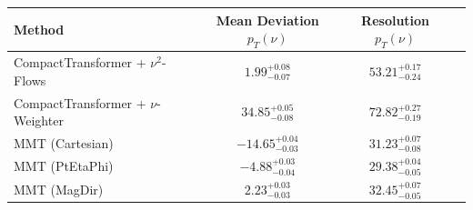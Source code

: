     \begin{tabular}{lccc}
        \toprule
        Method & Mean Deviation $p_{T}({\nu})$ & Resolution $p_{T}({\nu})$ \\
        \midrule
        CompactTransformer + $\nu^2$-Flows & $1.99^{+0.08}_{-0.07}$ & $53.21^{+0.17}_{-0.24}$ \\
        CompactTransformer + $\nu$-Weighter & $34.85^{+0.05}_{-0.08}$ & $72.82^{+0.27}_{-0.19}$ \\
        MMT (Cartesian) & $-14.65^{+0.04}_{-0.03}$ & $31.23^{+0.07}_{-0.08}$ \\
        MMT (PtEtaPhi) & $-4.88^{+0.03}_{-0.04}$ & $29.38^{+0.04}_{-0.05}$ \\
        MMT (MagDir) & $2.23^{+0.03}_{-0.03}$ & $32.45^{+0.07}_{-0.05}$ \\
        \bottomrule
    \end{tabular}